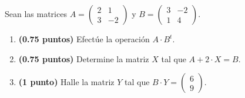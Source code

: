 
Sean las matrices $A=\begin{pmatrix}2&1\\3&-2\end{pmatrix}$ y $B=\begin{pmatrix}3&-2\\1&4\end{pmatrix}$.
\begin{enumerate}[label=\alph*)]
\item \textbf{(0.75 puntos)} Efectúe la operación $A\cdot B^t$.
\item \textbf{(0.75 puntos)} Determine la matriz $X$ tal que $A+2\cdot X=B$.
\item \textbf{(1 punto)} Halle la matriz $Y$ tal que $B\cdot Y=\begin{pmatrix}6\\9\end{pmatrix}$.
\end{enumerate}
